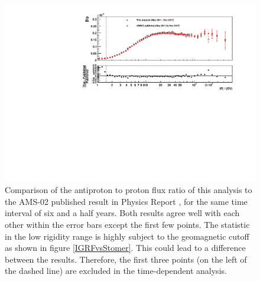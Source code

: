 \begin{figure}[hptb]
\centering
\includegraphics[width=1.0\textwidth, height=0.36\textheight]{Figures/chapter5/timeaveraged/fullratio_NOT_overlapped_PhysicsReport2021_PhyRep2021.pdf}
\caption[Comparison between the antiproton to proton flux ratio in this analysis and in the Physics Report.]{Comparison of the antiproton to proton flux ratio of this analysis to the AMS-02 published result in Physics Report \cite{PhysicsReport2}, for the same time interval of six and a half years. Both results agree well with each other within the error bars except the first few points. The statistic in the low rigidity range is highly subject to the geomagnetic cutoff as shown in figure \ref{IGRFvsStomer}. This could lead to a difference between the results. Therefore, the first three points (on the left of the dashed line) are excluded in the time-dependent analysis.}
\label{PbarRatioCompareWithPhysicsReport}
\end{figure}

